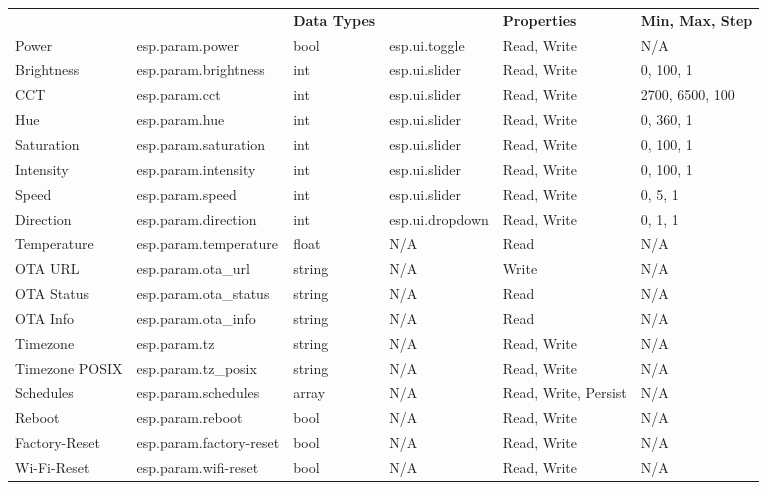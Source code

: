 \documentclass[a4paper,12pt,openany]{book}
\begin{document}
\begin{enumerate}[label=\textbf{(\arabic*)}]
{\begin{longtable}{|>{\RaggedRight}m{}|>{\RaggedRight}m{}|m{}|>{\RaggedRight}m{}|m{}|m{}|}
        \multicolumn{6}{r}{Continuation of Table \ref{9.7}}\\
        \hline
        \rowcolor{LightBlue}\multicolumn{1}{|c|}{\textbf{Name}}&\multicolumn{1}{c|}{\textbf{Type}}&\multicolumn{1}{c|}{\textbf{Data Types}}&\multicolumn{1}{c|}{\textbf{UI Type}}&\textbf{Properties}&\textbf{Min, Max, Step}\\
        \hline
        \endhead

        Power&esp.param.power&bool&esp.ui.toggle&Read, Write&N/A\\
        \hline
        Brightness&esp.param.brightness&int&esp.ui.slider&Read, Write&0, 100, 1\\
        \hline
        CCT&esp.param.cct&int&esp.ui.slider&Read, Write&2700, 6500, 100\\
        \hline
        Hue&esp.param.hue&int&esp.ui.slider&Read, Write&0, 360, 1\\
        \hline
        Saturation&esp.param.saturation&int&esp.ui.slider&Read, Write&0, 100, 1\\
        \hline
        Intensity&esp.param.intensity&int&esp.ui.slider&Read, Write&0, 100, 1\\
        \hline
        Speed&esp.param.speed&int&esp.ui.slider&Read, Write&0, 5, 1\\
        \hline
        Direction&esp.param.direction&int&esp.ui.dropdown&Read, Write&0, 1, 1\\
        \hline
        Temperature&esp.param.temperature&float&N/A&Read&N/A\\
        \hline
        OTA URL&esp.param.ota\_url&string&N/A&Write&N/A\\
        \hline
        OTA Status&esp.param.ota\_status&string&N/A&Read&N/A\\
        \hline
        OTA Info&esp.param.ota\_info&string&N/A&Read&N/A\\
        \hline
        Timezone&esp.param.tz&string&N/A&Read, Write&N/A\\
        \hline
        Timezone POSIX&esp.param.tz\_posix&string&N/A&Read, Write&N/A\\
        \hline
        Schedules&esp.param.schedules&array&N/A&Read, Write, Persist&N/A\\
        \hline
        Reboot&esp.param.reboot&bool&N/A&Read, Write&N/A\\
        \hline
        Factory-Reset&esp.param.factory-reset&bool&N/A&Read, Write&N/A\\
        \hline
        Wi-Fi-Reset&esp.param.wifi-reset&bool&N/A&Read, Write&N/A\\

\end{longtable}}
\end{enumerate}
\end{document}
